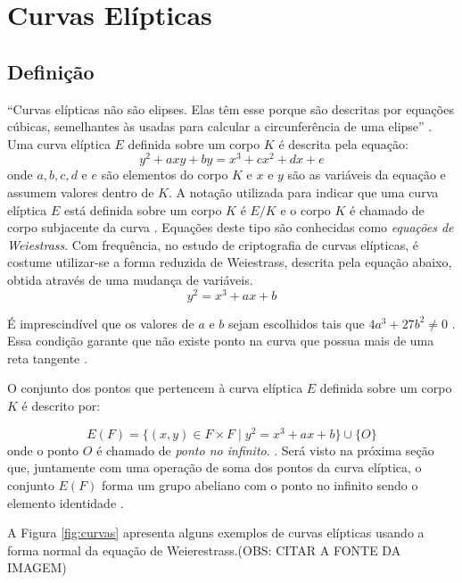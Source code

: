 %
%
\section{Curvas Elípticas}

\subsection{Definição}
``Curvas elípticas não são elipses. Elas têm esse porque são descritas por equações cúbicas, semelhantes às usadas para calcular a circunferência de uma elipse'' \cite{Stallings:2011}. Uma curva elíptica $E$ definida sobre um corpo $K$ é descrita pela equação:
\begin{equation}
y^2 + axy + by = x^3 + cx^2 + dx + e \label{eq:5}
\end{equation}
onde \(a, b, c, d\) e \(e\) são elementos do corpo $K$ e \(x\) e \(y\) são as variáveis da equação e assumem valores dentro de $K$. A notação utilizada para indicar que uma curva elíptica $E$ está definida sobre um corpo $K$ é $E/K$ e o corpo $K$ é chamado de corpo subjacente da curva \cite{Hankerson:2004}. Equações deste tipo são conhecidas como \textit{equações de Weiestrass}. Com frequência, no estudo de criptografia de curvas elípticas, é costume utilizar-se a forma reduzida de Weiestrass, descrita pela equação abaixo, obtida através de uma mudança de variáveis.
\begin{equation}
y^2 = x^3 + ax + b \label{eq:6}
\end{equation}

É imprescindível que os valores de $a$ e $b$ sejam escolhidos tais que $4a^3 + 27b^2 \ne 0$ \cite{Mandy:2007}. Essa condição garante que não existe ponto na curva que possua mais de uma reta tangente \cite{Hankerson:2004}.

O conjunto dos pontos que pertencem à curva elíptica $E$ definida sobre um corpo $K$ é descrito por:

$$ E(F) = \{(x,y) \in F \times F \mid y^2 = x^3 + ax + b\} \cup \{O\} $$
onde o ponto ${O}$ é chamado de \textit{ponto no infinito}. \cite{Mandy:2007}.
Será visto na próxima seção que, juntamente com uma operação de soma dos pontos da curva elíptica, o conjunto $E(F)$ forma um grupo abeliano com o ponto no infinito sendo o elemento identidade \cite{Hankerson:2004}.

A Figura \ref{fig:curvas} apresenta alguns exemplos de curvas elípticas usando a forma normal da equação de Weierestrass.(OBS: CITAR A FONTE DA IMAGEM)

